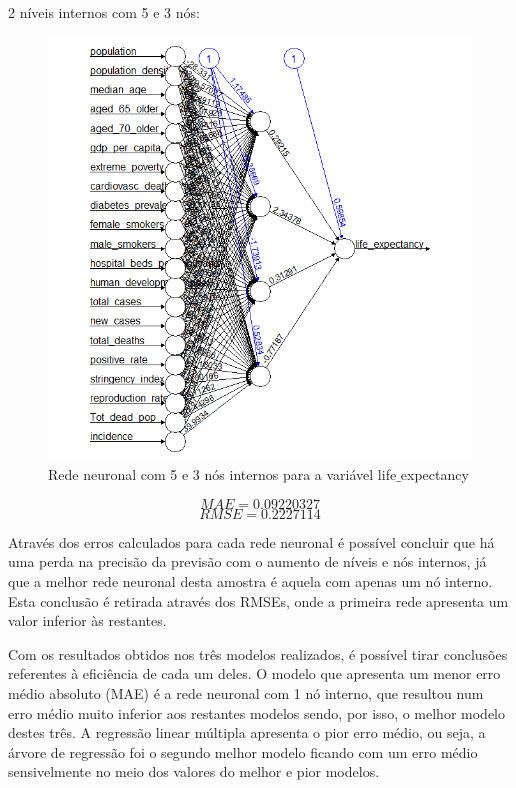 \documentclass[conference]{IEEEtran}
\begin{document}
2 níveis internos com 5 e 3 nós:
\begin{figure}[htbp]
\centerline{\includegraphics[width=0.95\columnwidth]{images/04_4.png}}
\caption{Rede neuronal com 5 e 3 nós internos para a variável life$\_$expectancy}
\label{4c3}
\end{figure}
\begin{equation}
MAE=0.09220327\label{4c3_mae}
\end{equation}
\begin{equation}
RMSE=0.2227114\label{4c3_rmse}
\end{equation}


Através dos erros calculados para cada rede neuronal é possível concluir que há uma perda na precisão da previsão com o aumento de níveis e nós internos, já que a melhor rede neuronal desta amostra é aquela com apenas um nó interno. Esta conclusão é retirada através dos RMSEs, onde a primeira rede apresenta um valor inferior às restantes.

Com os resultados obtidos nos três modelos realizados, é possível tirar conclusões referentes à eficiência de cada um deles. O modelo que apresenta um menor erro médio absoluto (MAE) é a rede neuronal com 1 nó interno, que resultou num erro médio muito inferior aos restantes modelos sendo, por isso, o melhor modelo destes três.
A regressão linear múltipla apresenta o pior erro médio, ou seja, a árvore de regressão foi o segundo melhor modelo ficando com um erro médio sensivelmente no meio dos valores do melhor e pior modelos.
\end{document}
